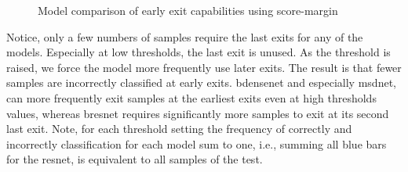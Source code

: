 \begin{minipage}{\linewidth}
\begin{figure}
		\hfill
		\hfill
		\hfill
		\hfill
		
		\caption[Model comparison of early exit capabilities]{Model comparison of early exit capabilities using score-margin}
		\label{fig:model_threshold_comparison}
	\end{figure}
	
\end{minipage}

Notice, only a few numbers of samples require the last exits for any of the models. Especially at low thresholds, the last exit is unused. As the threshold is raised, we force the model more frequently use later exits. The result is that fewer samples are incorrectly classified at early exits. \gls{bdensenet} and especially \gls{msdnet}, can more frequently exit samples at the earliest exits even at high thresholds values, whereas \gls{bresnet} requires significantly more samples to exit at its second last exit.
Note, for each threshold setting the frequency of correctly and incorrectly classification for each model sum to one, i.e., summing all blue bars for the \gls{resnet}, is equivalent to all samples of the test.

